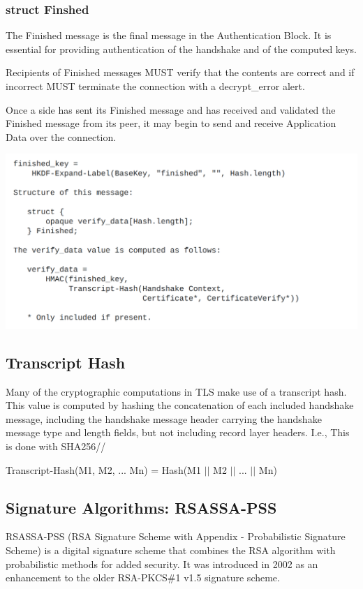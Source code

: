 \documentclass{article}
\begin{document}
\subsubsection{struct Finshed}
   The Finished message is the final message in the Authentication
   Block.  It is essential for providing authentication of the handshake
   and of the computed keys.

   Recipients of Finished messages MUST verify that the contents are
   correct and if incorrect MUST terminate the connection with a
   decrypt\_error alert.

   Once a side has sent its Finished message and has received and
   validated the Finished message from its peer, it may begin to send
   and receive Application Data over the connection.

\begin{center}
       \includegraphics[width=1.1\columnwidth]{media/Finshed.png}
\end{center}

\subsection{Transcript Hash}
   Many of the cryptographic computations in TLS make use of a
   transcript hash.  This value is computed by hashing the concatenation
   of each included handshake message, including the handshake message
   header carrying the handshake message type and length fields, but not
   including record layer headers.  I.e., This is done with SHA256//

    Transcript-Hash(M1, M2, ... Mn) = Hash(M1 $||$ M2 $||$ ... $||$ Mn)

\subsection{Signature Algorithms: RSASSA-PSS}
   RSASSA-PSS (RSA Signature Scheme with Appendix - Probabilistic Signature Scheme) is a digital signature scheme that combines the RSA algorithm with probabilistic methods for added security. It was introduced in 2002 as an enhancement to the older RSA-PKCS\#1 v1.5 signature scheme.
\end{document}
